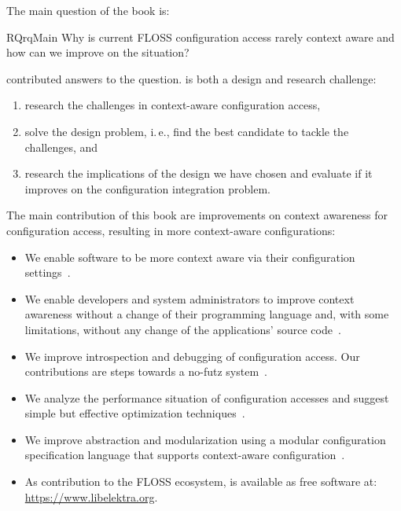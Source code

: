 The main question of the book is:

\begin{restatable}{RQ}{rqMain}
Why is current FLOSS configuration access rarely context aware and how can we improve on the situation?%
\label{rq:main}
\end{restatable}


\citet{raab2014program,raab2015global,raab2015safe,raab2015kps,raab2016improving,raab2016unanticipated,raab2016persistent,raab2016elektra,raab2017introducing,raab2017challenges} contributed answers to the question.
 is both a design and research challenge:

\begin{enumerate}
\item research the challenges in context-aware configuration access,
\item solve the design problem, i.\,e., find the best candidate to tackle the challenges, and
\item research the implications of the design we have chosen and evaluate if it improves on the configuration integration problem.
\end{enumerate}

The main contribution of this book are improvements on context awareness for configuration access, resulting in more context-aware configurations:
\begin{itemize}
\item We enable software to be more context aware via their configuration settings~\cite{raab2015kps}.
\item We enable developers and system administrators to improve context awareness without a change of their programming language and, with some limitations, without any change of the applications' source code~\cite{raab2016unanticipated}.
\item We improve introspection and debugging of configuration access. Our contributions are steps towards a no-futz system~\cite{holland2001nofutz}.
\item We analyze the performance situation of configuration accesses and suggest simple but effective optimization techniques~\cite{raab2014program}.
\item We improve abstraction and modularization using a modular configuration specification language that supports context-aware configuration~\cite{raab2016improving}.
\item As contribution to the FLOSS ecosystem, \elektra{} is available as free software at:
\url{https://www.libelektra.org}.
\end{itemize}



